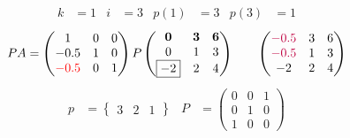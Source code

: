 \documentclass[pdf]{beamer}
\begin{document}
\begin{frame}{}\begin{align*} k &= 1 & i &= 3 & p(1) &= 3 & p(3) &= 1\end{align*}$$PA=\begin{pmatrix}1&0&0\\-0.5&1&0\\{\color{red}-0.5}&0&1\end{pmatrix} P \begin{pmatrix}\mathbf{0}&\mathbf{3}&\mathbf{6}\\0&1&3\\\boxed{-2}&2&4\end{pmatrix} \quad\quad \begin{pmatrix}{\color{purple}-0.5}&3&6\\{\color{purple}-0.5}&1&3\\-2&2&4\end{pmatrix}$$\begin{align*} p&= \begin{Bmatrix}3&2&1\end{Bmatrix} & P&= \begin{pmatrix}0&0&1\\0&1&0\\1&0&0\end{pmatrix} \end{align*}\end{frame}
\end{document}
